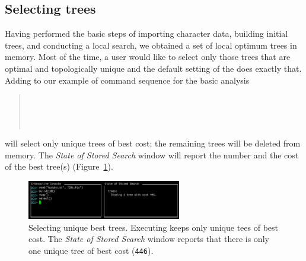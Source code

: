 
\subsection{Selecting trees}

Having performed the basic steps of importing character data, building initial trees, and conducting a local search, we obtained a set of local optimum trees in memory. Most of the time, a user would like to select only those trees that are optimal and topologically unique and the default setting of the  does exactly that. Adding  to our example of command sequence for the basic analysis 
\begin{quote}
 	\\
 	\\
	\\
\end{quote}
will select only unique trees of best cost; the remaining trees will be deleted from memory. The \emph{State of Stored Search} window will report the number and the cost of the best tree(s) (Figure~\ref{fig:select}).

\begin{figure}[]
    \begin{center}
        \includegraphics[width=0.6\textwidth]{figures/select.jpg}
    \end{center}
    \caption{Selecting unique best trees. Executing  keeps only unique tees of best cost. The \emph{State of Stored Search} window reports that there is only one unique tree of best cost (\texttt{446}).}
    \label{fig:select}
\end{figure}

